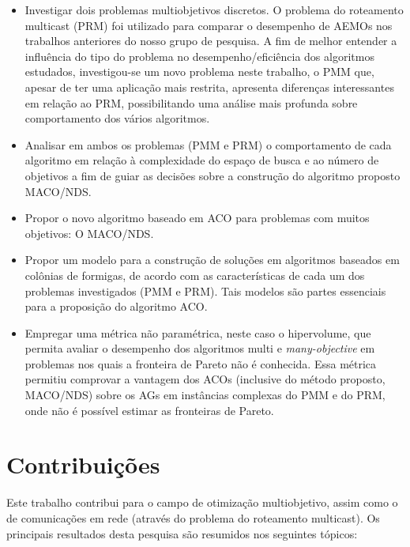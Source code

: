 \begin{itemize}
	\item Investigar dois problemas multiobjetivos discretos. O problema do roteamento multicast (PRM) foi utilizado para comparar o desempenho de AEMOs nos trabalhos anteriores do nosso grupo de pesquisa. A fim de melhor entender a influência do tipo do problema no desempenho/eficiência dos algoritmos estudados, investigou-se um novo problema neste trabalho, o \ac{PMM} que, apesar de ter uma aplicação mais restrita, apresenta diferenças interessantes em relação ao \ac{PRM}, possibilitando uma análise mais profunda sobre comportamento dos vários algoritmos.
	\item Analisar em ambos os problemas (\ac{PMM} e \ac{PRM}) o comportamento de cada algoritmo em relação à complexidade do espaço de busca e ao número de objetivos a fim de guiar as decisões sobre a construção do algoritmo proposto MACO/NDS.
	\item Propor o novo algoritmo baseado em \ac{ACO} para problemas com muitos objetivos: O \ac{MACO/NDS}. 
	\item Propor um modelo para a construção de soluções em algoritmos baseados em colônias de formigas, de acordo com as características de cada um dos problemas investigados (PMM e PRM). Tais modelos são partes essenciais para a proposição do algoritmo ACO.
	\item Empregar uma métrica não paramétrica, neste caso o hipervolume, que permita avaliar o desempenho dos algoritmos multi e \textit{many-objective} em problemas nos quais a fronteira de Pareto não é conhecida. Essa métrica permitiu comprovar a vantagem dos ACOs (inclusive do método proposto, MACO/NDS) sobre os AGs em instâncias complexas do PMM e do PRM, onde não é possível estimar as fronteiras de Pareto.
\end{itemize}


\section{Contribuições}
Este trabalho contribui para o campo de otimização multiobjetivo, assim como o de comunicações em rede (através do problema do roteamento multicast). Os principais resultados desta pesquisa são resumidos nos seguintes tópicos:

